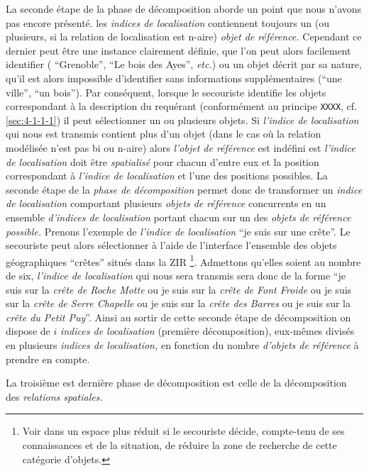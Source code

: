 La seconde étape de la phase de décomposition aborde un point que
nous n'avons pas encore présenté.
%
les \emph{indices de localisation} contiennent toujours un (ou
plusieurs, si la relation de localisation est n-aire) \emph{objet de
  référence.} Cependant ce dernier peut être une instance clairement
définie, que l'on peut alors facilement identifier (\eg
\enquote{Grenoble}, \enquote{Le bois des Ayes}, \emph{etc.}) ou un
objet décrit par sa nature, qu'il est alors impossible d'identifier
sans informations supplémentaires (\eg \enquote{une ville},
\enquote{un bois}). Par conséquent, lorsque le secouriste identifie
les objets correspondant à la description du requérant (conformément
au principe \texttt{XXXX}, cf. \ref{sec:4-1-1-1}) il peut sélectionner
un ou plusieurs objets. Si \emph{l'indice de localisation} qui nous
est transmis contient plus d'un objet (dans le cas où la relation
modélisée n'est pas bi ou n-aire) alors \emph{l'objet de référence}
est indéfini est \emph{l'indice de localisation} doit être
\emph{spatialisé} pour chacun d'entre eux et la position correspondant
à \emph{l'indice de localisation} et l'une des positions possibles.
La seconde étape de la \emph{phase de décomposition} permet donc de
transformer un \emph{indice de localisation} comportant plusieurs
\emph{objets de référence} concurrents en un ensemble \emph{d'indices
  de localisation} portant chacun sur un des \emph{objets de référence
  possible.} Prenons l'exemple de \emph{l'indice de localisation}
\enquote{je suis sur une crête}. Le secouriste peut alors sélectionner
à l'aide de l'interface l'ensemble des objets géographiques
\enquote{crêtes} situés dans la ZIR \footnote{Voir dans un espace plus
  réduit si le secouriste décide, compte-tenu de ses connaissances et
  de la situation, de réduire la zone de recherche de cette catégorie
  d'objets.}. Admettons qu'elles soient au nombre de six,
\emph{l'indice de localisation} qui nous sera transmis sera donc de la
forme \enquote{je suis sur la \emph{crête de Roche Motte} ou je suis
  sur la \emph{crête de Font Froide} ou je suis sur la \emph{crête de
    Serre Chapelle} ou je suis sur la \emph{crête des Barres} ou je
  suis sur la \emph{crête du Petit Puy}}. Ainsi au sortir de cette
seconde étape de décomposition on dispose de \(i\) \emph{indices de
  localisation} (première décomposition), eux-mêmes divisés en
plusieurs \emph{indices de localisation,} en fonction du nombre
\emph{d'objets de référence} à prendre en compte.

La troisième est dernière phase de décomposition est celle de la
décomposition des \emph{relations spatiales.}

